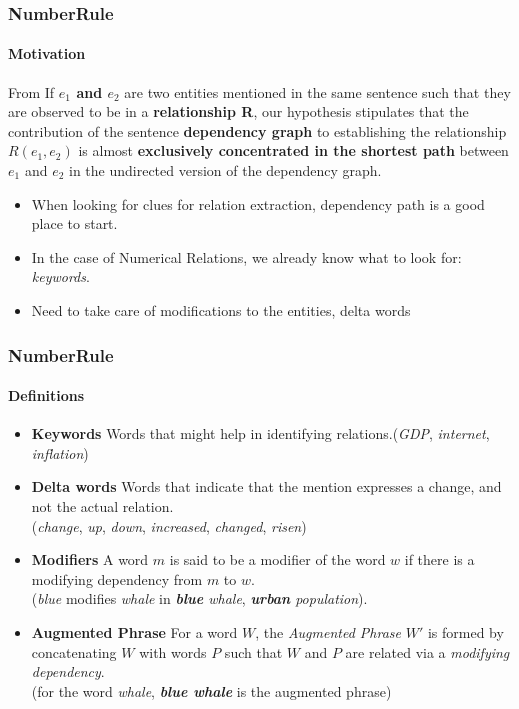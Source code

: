 \documentclass{beamer}
\newcommand{\ntronitemsep}{1em}
\begin{document}

\begin{frame}
\frametitle{NumberRule}
\framesubtitle{Motivation}

\begin{block}{From \cite{shortestpathdep}}
If \textbf{$e_1$ and $e_2$ }are two entities mentioned in the same
 sentence such that they are observed to be in a \textbf{relationship R}, our hypothesis stipulates that the contribution of the sentence \textbf{dependency graph} to establishing the relationship $R(e_1, e_2)$ is almost \textbf{exclusively concentrated in the shortest path} between $e_1$ and $e_2$ in the undirected version of the dependency graph.
\end{block}
\begin{itemize}
\item When looking for clues for relation extraction, dependency path is a good place to start.
\item In the case of Numerical Relations, we already know what to look for: \textit{keywords}.
\item Need to take care of modifications to the entities, delta words
\end{itemize}
\end{frame}


\begin{frame}
\frametitle{NumberRule}
\framesubtitle{Definitions}
\begin{itemize}
\setlength\itemsep{\ntronitemsep}

 \item \textbf{Keywords}  Words that might help in identifying relations.(\textit{GDP}, \textit{internet}, \textit{inflation})
 \item \textbf{Delta words} Words that indicate that the mention expresses a change, and not the actual relation. \\ (\textit{change}, \textit{up}, \textit{down}, \textit{increased}, \textit{changed}, \textit{risen})
  \item \textbf{Modifiers} A word $m$ is said to be a modifier of the word $w$ if there is a modifying dependency from $m$ to $w$.\\ (\textit{blue} modifies \textit{whale} in \emph{\textbf{blue} whale}, \emph{\textbf{urban} population}).
  \item \textbf{Augmented Phrase} For a word $W$, the \emph{Augmented Phrase} $W'$ is formed by concatenating $W$ with words $P$ such that $W$ and $P$ are related via a \emph{modifying dependency}. \\(for the word \textit{whale}, \textbf{\textit{blue whale}} is the augmented phrase)
\end{itemize}

\end{frame}
\end{document}
